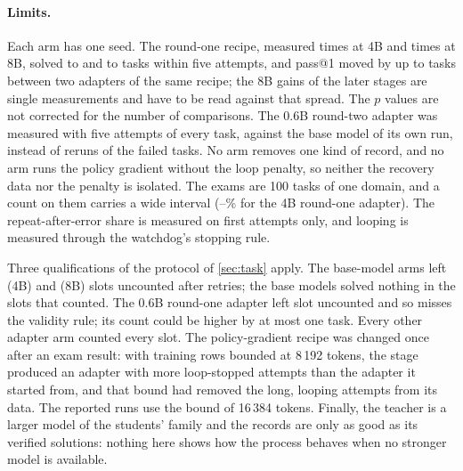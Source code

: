 \paragraph{Limits.} Each arm has one seed. The round-one recipe, measured \roundOneFourRuns{} times at 4B and
\roundOneEightRuns{} times at 8B, solved \roundOneFourMin{} to \roundOneFourMax{} and \roundOneEightMin{} to
\roundOneEightMax{} tasks within five attempts, and pass@1 moved by up to \replicateEightOneDiff{} tasks between two
adapters of the same recipe; the 8B gains of the later stages are single measurements and have to be read against that
spread. The $p$ values are not corrected for the number of comparisons. The 0.6B round-two adapter was measured with five attempts of every task, against the base model of its own run, instead of reruns of the failed tasks. No
arm removes one kind of record, and no arm runs the policy gradient without the loop penalty, so neither the recovery
data nor the penalty is isolated. The exams are 100 tasks of one domain, and a count on them carries a wide interval
(\examFourFullFiveLo--\examFourFullFiveHi{}\% for the 4B round-one adapter). The repeat-after-error share is measured
on first attempts only, and looping is measured through the watchdog's stopping rule.

Three qualifications of the protocol of \cref{sec:task} apply. The base-model arms left \uncountedFourBase{} (4B) and
\uncountedEightBase{} (8B) slots uncounted after retries; the base models solved nothing in the slots that counted.
The 0.6B round-one adapter left \uncountedZeroFull{} slot uncounted and so misses the validity rule; its count could
be higher by at most one task. Every other adapter arm counted every slot. The policy-gradient recipe
was changed once after an exam result: with training rows bounded at 8\,192 tokens, the stage produced an adapter with
more loop-stopped attempts than the adapter it started from, and that bound had removed the long, looping attempts from
its data. The reported runs use the bound of 16\,384 tokens. Finally, the teacher is a larger model of the students'
family and the records are only as good as its verified solutions: nothing here shows how the process behaves when no
stronger model is available.
